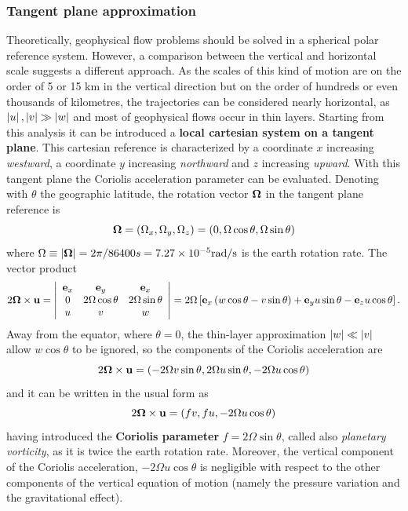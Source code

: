 \subsubsection*{Tangent plane approximation}
Theoretically, geophysical flow problems should be solved in a spherical polar reference system. However, a comparison between the vertical and horizontal scale suggests a different approach. As the scales of this kind of motion are on the order of 5 or 15 km in the vertical direction but on the order of hundreds or even thousands of kilometres, the trajectories can be considered nearly horizontal, as $\left\lvert u \right\rvert,\left\lvert v \right\rvert\gg\left\lvert w \right\rvert$ and most of geophysical flows occur in thin layers. Starting from this analysis it can be introduced a \textbf{local cartesian system on a tangent plane}. This cartesian reference is characterized by a coordinate $x$ increasing \textit{westward}, a coordinate $y$ increasing \textit{northward} and $z$ increasing \textit{upward}. With this tangent plane the Coriolis acceleration parameter can be evaluated. Denoting with $\theta$ the geographic latitude, the rotation vector $\boldsymbol{\Omega}$ in the tangent plane reference is 
\begin{equation}
\boldsymbol{\Omega}=\left( \Omega_{x},\Omega_{y},\Omega_{z} \right)=\left( 0,\Omega\cos\theta,\Omega\sin\theta \right)
\end{equation}
where $\Omega\equiv\left\lvert \boldsymbol{\Omega} \right\rvert=2\pi/86400s=7.27\times 10^{-5}\text{rad/s}$ is the earth rotation rate. The vector product
\begin{equation*}
2\boldsymbol{\Omega}\times\mathbf{u}=\left|\begin{array}{ccc}
\mathbf{e}_{x}&\mathbf{e}_{y}&\mathbf{e}_{x}\\
0&2\Omega\cos\theta&2\Omega\sin\theta\\
u&v&w
\end{array}\right|=
2\Omega\left[ \mathbf{e}_{x}\left( w\cos\theta-v\sin\theta \right)+\mathbf{e}_{y}u\sin\theta-\mathbf{e}_{z}u\cos\theta \right].
\end{equation*}
Away from the equator, where $\theta=0$, the thin-layer approximation $\left\lvert w \right\rvert\ll\left\lvert v \right\rvert$ allow $w\cos\theta$ to be ignored, so the components of the Coriolis acceleration are
\begin{equation*}
2\boldsymbol{\Omega}\times\mathbf{u}=\left( -2\Omega v\sin\theta,2\Omega u\sin\theta,-2\Omega u\cos\theta \right)
\end{equation*}
and it can be written in the usual form as
\begin{equation}
2\boldsymbol{\Omega}\times\mathbf{u}=\left( fv,fu,-2\Omega u\cos\theta \right)
\end{equation}
having introduced the \textbf{Coriolis parameter} $f=2\Omega\sin\theta$, called also \textit{planetary vorticity}, as it is twice the earth rotation rate. Moreover, the vertical component of the Coriolis acceleration, $-2\Omega u\cos\theta$ is negligible with respect to the other components of the vertical equation of motion (namely the pressure variation and the gravitational effect).
